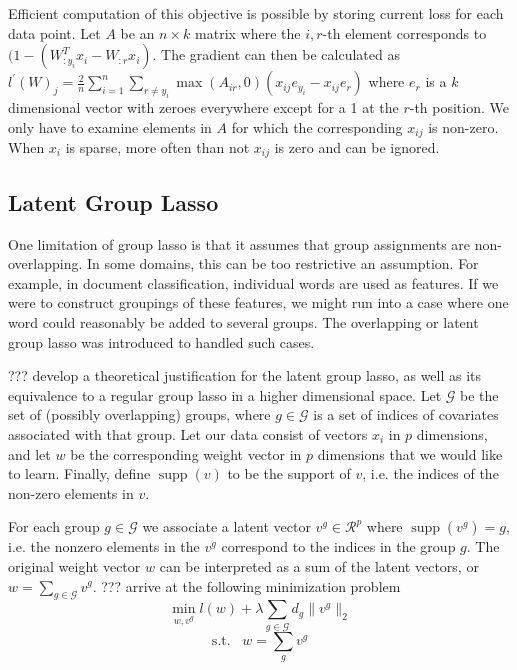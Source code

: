 \documentclass[11pt]{article}
\begin{document}
Efficient computation of this objective is possible by storing current 
loss for each data point. Let $A$ be an $n\times k$ matrix where the 
$i,r$-th element corresponds to 
 $(1-(W_{:y_i}^Tx_i - W_{:r}x_i).$
 The gradient can then be calculated as 
 $l^\prime(W)_{j} = \frac{2}{n}\sum_{i=1}^n\sum_{r\ne y_i}
 \max(A_{ir}, 0)(x_{ij}e_{y_i} - x_{ij} e_r)$
where $e_r$ is a $k$ dimensional vector with zeroes everywhere except for a 1
at the $r$-th position. We only have to examine elements in $A$ for which 
the corresponding $x_{ij}$ is non-zero. When $x_{i}$ is sparse, more often
than not $x_{ij}$ is zero and can be ignored.



\subsection{Latent Group Lasso}

One limitation of group lasso is that it assumes that group assignments are
non-overlapping. In some domains, this can be too restrictive an assumption.
For example, in document classification, individual words are used as features.
If we were to construct groupings of these features, we might run into a case
where one word could reasonably be added to several groups. The overlapping or
latent group lasso was introduced to handled such cases.

??? develop a theoretical justification for the latent group lasso, as well
as its equivalence to a regular group lasso in a higher dimensional space.
Let $\mathcal{G}$ be the set of (possibly overlapping) groups,
where $g \in \mathcal{G}$ is a set of indices of covariates associated with 
that group. 
Let our
data consist of vectors $x_i$ in $p$ dimensions, and let $w$ be the 
corresponding weight vector in $p$ dimensions that we would like to learn.
Finally, define $\operatorname{supp}(v)$ to be the support of $v$, i.e.
the indices of the non-zero elements in $v$.


For each group
$g \in \mathcal{G}$ we associate a latent vector $v^g \in \mathcal{R}^p$ where
$\operatorname{supp}(v^g) = g$, i.e. the nonzero elements in the $v^g$ correspond
to the indices in the group $g$. 
The original weight vector $w$ can be
interpreted as a sum of the latent vectors, or
$w = \sum_{g \in \mathcal{G}} v^g$. 
??? arrive at the following minimization
problem 
$$ \min_{w, v^g} l(w) + \lambda \sum_{g \in \mathcal{G}} d_g \|v^g \|_2 $$
$$\mathrm{s.t.}\;\;\; w = \sum_g v^g$$ 
\end{document}
